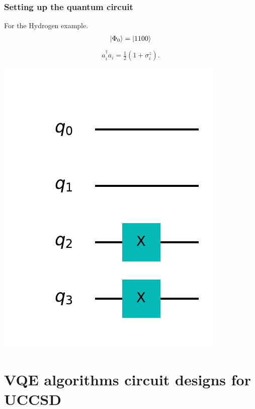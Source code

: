 \documentclass{beamer}
\renewcommand{\(}{\left(}
\renewcommand{\)}{\right)}
\renewcommand{\[}{\left[}
\renewcommand{\]}{\right]}
\begin{document}
\begin{frame}
    \frametitle{Setting up the quantum circuit }
    For the Hydrogen example. 
    \begin{align*}
        \ket{\Phi_0} = \ket{1100}
    \end{align*}
    \begin{align*}
        a^\dagger_i a_i = \frac{1}{2} (1 + \sigma^z_i ). 
    \end{align*}
    
    \centering
    \includegraphics[scale=0.5]{initial_state_r.pdf}
\end{frame}




\section{VQE algorithms circuit designs for UCCSD}
\end{document}
